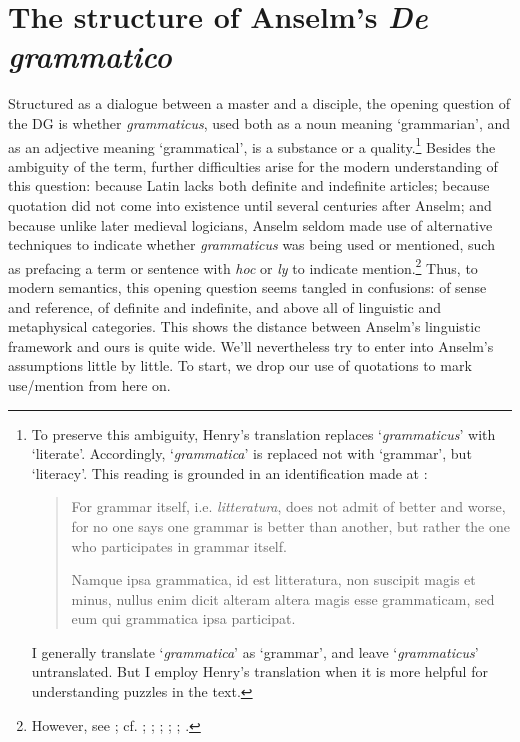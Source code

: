 \documentclass[]{article}
\begin{document}
\section{The structure of Anselm's \textit{De grammatico}}
Structured as a dialogue between a master and a disciple, the opening question of the DG is whether \textit{grammaticus}, used both as a noun meaning `grammarian', and as an adjective meaning `grammatical', is a substance or a quality.\footnote{To preserve this ambiguity, Henry's translation replaces `\textit{grammaticus}' with `literate'. Accordingly, `\textit{grammatica}' is replaced not with `grammar', but `literacy'. This reading is grounded in an identification made at \cite[BC 257C]{BC}: 
\begin{quote}
For grammar itself, i.e. \textit{litteratura}, does not admit of better and worse, for no one says one grammar is better than another, but rather the one who participates in grammar itself.

Namque ipsa grammatica, id est litteratura, non suscipit magis et minus, nullus enim dicit alteram altera magis esse grammaticam, sed eum qui grammatica ipsa participat.
\end{quote}
I generally translate `\textit{grammatica}' as `grammar', and leave `\textit{grammaticus}' untranslated. But I employ Henry's translation when it is more helpful for understanding puzzles in the text.} Besides the ambiguity of the term, further difficulties arise for the modern understanding of this question: because Latin lacks both definite and indefinite articles; because quotation did not come into existence until several centuries after Anselm; and because unlike later medieval logicians, Anselm seldom made use of alternative techniques to indicate whether \textit{grammaticus} was being used or mentioned, such as prefacing a term or sentence with \textit{hoc} or \textit{ly} to indicate mention.\footnote{However, see \cite[DG ch. 6, 9]{Anselm1974}; cf. \cite[1.1.78]{ScotusMetaph}; \cite[pp. 56-57]{Ebbesen1979}; \cite[pp. 141-142]{Ebbesen1987}; \cite[pp. 149-50]{Ebbesen1993}; \cite[\textit{passim}]{Green-Pedersen1980a,Green-Pedersen1980b}; \cite[\textit{In post. an.} 1.33.9]{AquinasPA}.} Thus, to modern semantics, this opening question seems tangled in confusions: of sense and reference, of definite and indefinite, and above all of linguistic and metaphysical categories. This shows the distance between Anselm's linguistic framework and ours is quite wide. We'll nevertheless try to enter into Anselm's assumptions little by little. To start, we drop our use of quotations to mark use/mention from here on.
\end{document}

